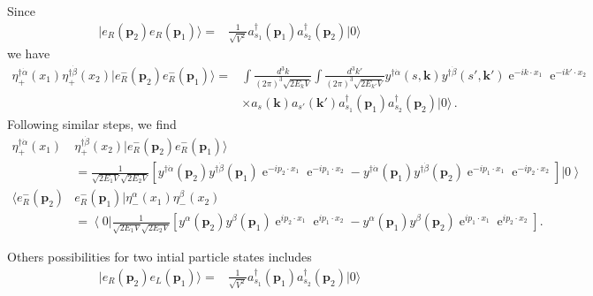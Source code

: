 Since
\begin{align}
  |e_R(\mathbf{p}_2)e_R(\mathbf{p}_1)\rangle=&\frac{1}{\sqrt{V^2}}a_{s_1}^\dagger(\mathbf{p}_1)a_{s_2}^\dagger(\mathbf{p}_2)|0\rangle
\end{align}
we have
\begin{align}
   \eta^{\dagger\dot{\alpha}}_+(x_1)\eta^{\dagger\dot{\beta}}_+(x_2)|e_R^-(\mathbf{p}_2)e_R^-(\mathbf{p}_1)\rangle=&
\int\frac{d^3k}{(2\pi)^3\sqrt{2E_k V}}\int\frac{d^3k'}{(2\pi)^3\sqrt{2E_{k'}V}}
y^{\dagger\dot{\alpha}}(s,\mathbf{k})y^{\dagger\dot{\beta}}(s',\mathbf{k}')\operatorname{e}^{-i k\cdot x_1}\operatorname{e}^{-i k'\cdot x_2}\nonumber\\
&\times a_s(\mathbf{k})a_{s'}(\mathbf{k}')a_{s_1}^\dagger(\mathbf{p}_1)a_{s_2}^\dagger(\mathbf{p}_2)|0\rangle \,.
\end{align}
Following similar steps, we find
\begin{align}
\eta^{\dagger\dot{\alpha}}_+(x_1)&\eta^{\dagger\dot{\beta}}_+(x_2)|e_R^-(\mathbf{p}_2)e_R^-(\mathbf{p}_1)\rangle
 \nonumber\\
\label{eq:berer}
&=\frac{1 }{\sqrt{2 E_1V}\sqrt{2 E_2V}} \left[ y^{\dagger\dot{\alpha}}(\mathbf{p}_2)y^{\dagger\dot{\beta}}(\mathbf{p}_1)
\operatorname{e}^{-i p_2\cdot x_1}\operatorname{e}^{-i p_1\cdot x_2}
-y^{\dagger\dot{\alpha}}(\mathbf{p}_1)y^{\dagger\dot{\beta}}(\mathbf{p}_2)
\operatorname{e}^{-i p_1\cdot x_1}\operatorname{e}^{-i p_2\cdot x_2}   \right] \left|0\right\rangle \\
\langle e_R^-(\mathbf{p}_2)&e_R^-(\mathbf{p}_1)| \eta^{\alpha}_-(x_1)\eta^{\beta}_-(x_2)
 \nonumber\\
\label{eq:berer}
&=\left\langle 0\right|\frac{1 }{\sqrt{2 E_1V}\sqrt{2 E_2V}} \left[ y^{\alpha}(\mathbf{p}_2)y^{\beta}(\mathbf{p}_1)
\operatorname{e}^{i p_2\cdot x_1}\operatorname{e}^{i p_1\cdot x_2}
- y^{\alpha}(\mathbf{p}_1)y^{\beta}(\mathbf{p}_2)
\operatorname{e}^{i p_1\cdot x_1}\operatorname{e}^{i p_2\cdot x_2}   \right].
\end{align}

Others possibilities for two intial particle states includes
\begin{align}
  |e_R(\mathbf{p}_2)e_L(\mathbf{p}_1)\rangle=&\frac{1}{\sqrt{V^2}}a_{s_1}^\dagger(\mathbf{p}_1)a_{s_2}^\dagger(\mathbf{p}_2)|0\rangle
\end{align}

